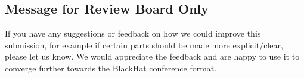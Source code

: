 \documentclass{article}
\begin{document}
\subsection{Message for Review Board Only}
If you have any suggestions or feedback on how we could improve this submission, for example if certain parts should be made more explicit/clear, please let us know. We would appreciate the feedback and are happy to use it to converge further towards the BlackHat conference format.
\end{document}
